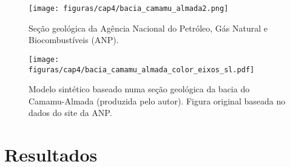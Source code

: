 \begin{figure}[H]
\centering
\texttt{[image: figuras/cap4/bacia\_camamu\_almada2.png]}
\caption{Seção geológica da Agência Nacional do Petróleo, Gás Natural e Biocombustíveis (ANP).}
\label{fig:camamu_almada_anp}
\end{figure}

\begin{figure}[H]
\centering
\texttt{[image: figuras/cap4/bacia\_camamu\_almada\_color\_eixos\_sl.pdf]}
\caption{Modelo sintético baseado numa seção geológica da bacia do Camamu-Almada (produzida pelo autor). Figura original baseada no dados do site da ANP.}
\label{fig:bacia_camamu_almada_color_eixos_sl}
\end{figure}

\section{Resultados}



